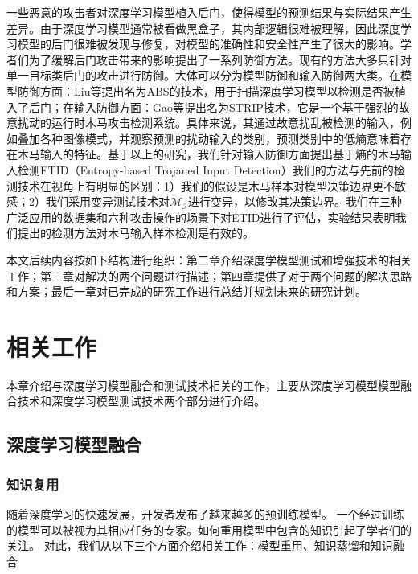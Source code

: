 \documentclass[fontset=macnew,UTF8]{article} %
\begin{document}
一些恶意的攻击者对深度学习模型植入后门\cite{liu2020survey,kaviani2021defense,li2022backdoor}，使得模型的预测结果与实际结果产生差异。由于深度学习模型通常被看做黑盒子，其内部逻辑很难被理解，因此深度学习模型的后门很难被发现与修复，对模型的准确性和安全性产生了很大的影响。学者们为了缓解后门攻击带来的影响提出了一系列防御方法。现有的方法大多只针对单一目标类后门的攻击进行防御。大体可以分为模型防御和输入防御两大类。在模型防御方面：Liu等\cite{liu2019abs}提出名为ABS的技术，用于扫描深度学习模型以检测是否被植入了后门；在输入防御方面：Gao等\cite{gao2019strip}提出名为STRIP技术，它是一个基于强烈的故意扰动的运行时木马攻击检测系统。具体来说，其通过故意扰乱被检测的输入，例如叠加各种图像模式，并观察预测的扰动输入的类别，预测类别中的低熵意味着存在木马输入的特征。基于以上的研究，我们针对输入防御方面提出基于熵的木马输入检测ETID（Entropy-based Trojaned Input Detection）我们的方法与先前的检测技术在视角上有明显的区别：1）我们的假设是木马样本对模型决策边界更不敏感；2）我们采用变异测试技术对$\mathcal{M}_\mathcal{I}$进行变异，以修改其决策边界。我们在三种广泛应用的数据集和六种攻击操作的场景下对ETID进行了评估，实验结果表明我们提出的检测方法对木马输入样本检测是有效的。

本文后续内容按如下结构进行组织：第二章介绍深度学模型测试和增强技术的相关工作；第三章对解决的两个问题进行描述；第四章提供了对于两个问题的解决思路和方案；最后一章对已完成的研究工作进行总结并规划未来的研究计划。

\section{相关工作}
本章介绍与深度学习模型融合和测试技术相关的工作，主要从深度学习模型模型融合技术和深度学习模型测试技术两个部分进行介绍。

\subsection{深度学习模型融合}
\subsubsection{知识复用}
随着深度学习的快速发展，开发者发布了越来越多的预训练模型。 一个经过训练的模型可以被视为其相应任务的专家\cite{yang2017deep}。如何重用模型中包含的知识引起了学者们的关注。 对此，我们从以下三个方面介绍相关工作：模型重用、知识蒸馏和知识融合
\end{document}
